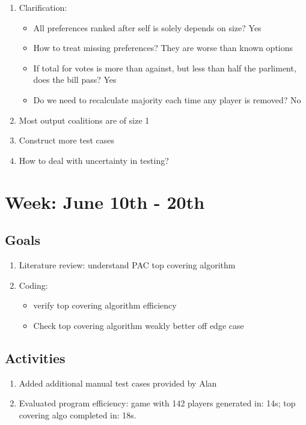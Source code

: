\documentclass[a4paper]{article}
\begin{document}
\begin{enumerate}
  \item Clarification:
  \begin{itemize}
    \item All preferences ranked after self is solely depends on size? Yes
    \item How to treat missing preferences? They are worse than known options
    \item If total for votes is more than against, but less than half the parliment, does the bill pass? Yes
    \item Do we need to recalculate majority each time any player is removed? No
  \end{itemize}
  \item Most output coalitions are of size 1
  \item Construct more test cases
  \item How to deal with uncertainty in testing?
\end{enumerate}

\section*{Week: June 10th - 20th}

\subsection*{Goals}

\begin{enumerate}
  \item Literature review: understand PAC top covering algorithm
  \item Coding:
  \begin{itemize}
    \item verify top covering algorithm efficiency
    \item Check top covering algorithm weakly better off edge case
  \end{itemize}
\end{enumerate}

\subsection*{Activities}

\begin{enumerate}
  \item Added additional manual test cases provided by Alan
  \item Evaluated program efficiency: game with 142 players generated in: 14s; top covering algo completed in: 18s.
\end{enumerate}
\end{document}
